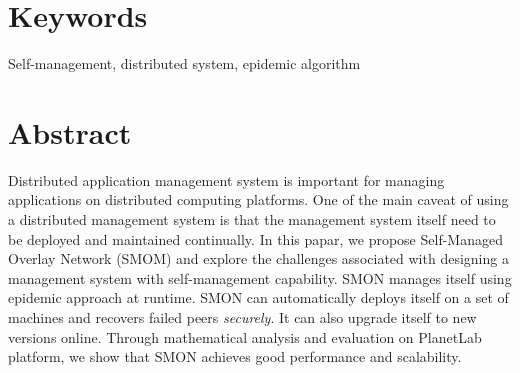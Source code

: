\section*{Keywords}
Self-management, distributed system, epidemic algorithm

\section*{Abstract}

Distributed application management system is important for
managing applications on distributed computing platforms. 
One of the main caveat of using a distributed management
system is that the management system itself need to be
deployed and maintained continually.  In this papar, we
propose Self-Managed Overlay Network (SMOM) and explore the
challenges associated with designing a management system
with self-management capability. SMON manages itself using
epidemic approach at runtime. SMON can automatically deploys
itself on a set of machines and recovers failed peers
\emph{securely}. It can also upgrade itself to new versions
online. Through mathematical analysis and evaluation on
PlanetLab platform, we show that SMON achieves good
performance and scalability.

